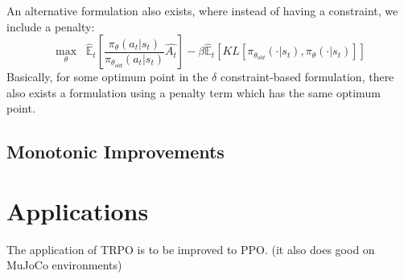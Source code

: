 \documentclass{article}
\begin{document}
An alternative formulation also exists, where instead of having a constraint, we include a penalty:
\[
    \max_\theta \;\; \hat{\mathbb{E}}_{t} \left [ \frac{{\pi_\theta} (a_t|s_t)}{{\pi_{\theta_{old}}} (a_t|s_t)} \hat{A_t} \right] - \beta \hat{\mathbb{E}}_{t} \left [ KL \left[  \pi_{\theta_{old}} (\cdot|s_t), \pi_{\theta} (\cdot|s_t)\right] \right]
\]
Basically, for some optimum point in the \(\delta\) constraint-based formulation, there also exists a formulation using a penalty term which has the same optimum point. 

\subsection{Monotonic Improvements}



\section[high]{Applications}
The application of TRPO is to be improved to PPO. 
(it also does good on MuJoCo environments)
\end{document}
